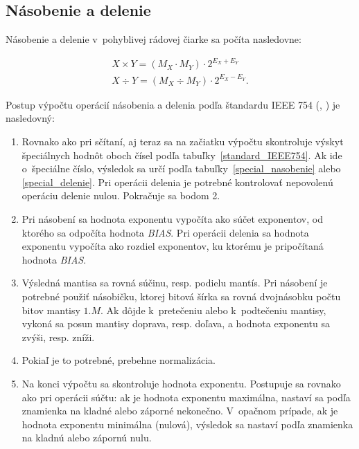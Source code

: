 \newpage
\subsection{Násobenie a delenie} \label{MulDivFP}
Násobenie a delenie v~pohyblivej rádovej čiarke sa počíta nasledovne:

\begin{eqnarray}
X \times Y = (M_{X} \cdot M_{Y})\cdot 2^{E_{X} + E_{Y}} \\
X \div Y = ({M_{X}} \div {M_{Y}})\cdot 2^{E_{X} - E_{Y}} .
\end{eqnarray}

Postup výpočtu operácií násobenia a delenia podľa štandardu IEEE 754 (\cite{FPOnline_operacie}, \cite{CamborBP}) je nasledovný:

\begin{enumerate}  
\item Rovnako ako pri sčítaní, aj teraz sa na začiatku výpočtu skontroluje výskyt špeciálnych hodnôt oboch čísel podľa tabuľky~\ref{standard_IEEE754}. Ak ide o~špeciálne číslo, výsledok sa určí podľa tabuľky~\ref{special_nasobenie} alebo \ref{special_delenie}. Pri operácii delenia je potrebné kontrolovať nepovolenú operáciu delenie nulou. Pokračuje sa bodom 2.

\item Pri násobení sa hodnota exponentu vypočíta ako súčet exponentov, od ktorého sa odpočíta hodnota \textit{BIAS}. Pri operácii delenia sa hodnota exponentu vypočíta ako rozdiel exponentov, ku ktorému je pripočítaná hodnota \textit{BIAS}.

\item Výsledná mantisa sa rovná súčinu, resp. podielu mantís. Pri násobení je potrebné použiť násobičku, ktorej bitová šírka sa rovná dvojnásobku počtu bitov mantisy $ 1.M $. Ak dôjde k~pretečeniu alebo k~podtečeniu mantisy, vykoná sa posun mantisy doprava, resp. doľava, a hodnota exponentu sa zvýši, resp. zníži.

\item Pokiaľ je to potrebné, prebehne normalizácia.

\item Na konci výpočtu sa skontroluje hodnota exponentu. Postupuje sa rovnako ako pri operácii súčtu: ak je hodnota exponentu maximálna, nastaví sa podľa znamienka na kladné alebo záporné nekonečno. V~opačnom prípade, ak je hodnota exponentu minimálna (nulová), výsledok sa nastaví podľa znamienka na kladnú alebo zápornú nulu.
\end{enumerate}


